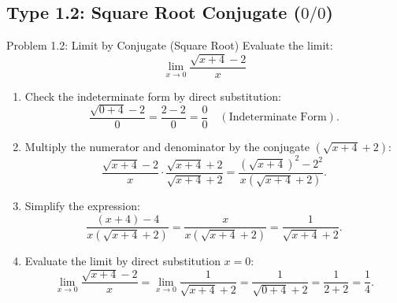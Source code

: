 \documentclass[11pt,a4paper]{article}
\begin{document}
\subsection{Type 1.2: Square Root Conjugate ($0/0$)}
\begin{problembox}{Problem 1.2: Limit by Conjugate (Square Root)}
Evaluate the limit:
\[
\lim_{x \to 0} \frac{\sqrt{x + 4} - 2}{x}
\]
\end{problembox}
\begin{solutionbox}
\begin{enumerate}
	\item [Step 1.] Check the indeterminate form by direct substitution:
	\begin{equation*}
		\frac{\sqrt{0 + 4} - 2}{0} = \frac{2 - 2}{0} = \frac{0}{0} \quad (\text{Indeterminate Form}).
	\end{equation*}
	
	\item [Step 2.] Multiply the numerator and denominator by the conjugate $(\sqrt{x + 4} + 2)$:
	\begin{equation*}
		\frac{\sqrt{x + 4} - 2}{x} \cdot \frac{\sqrt{x + 4} + 2}{\sqrt{x + 4} + 2} = \frac{(\sqrt{x + 4})^2 - 2^2}{x(\sqrt{x + 4} + 2)}.
	\end{equation*}

	\item [Step 3.] Simplify the expression:
	\begin{equation*}
		\frac{(x + 4) - 4}{x(\sqrt{x + 4} + 2)} = \frac{x}{x(\sqrt{x + 4} + 2)} = \frac{1}{\sqrt{x + 4} + 2}.
	\end{equation*}

	\item [Step 4.] Evaluate the limit by direct substitution $x = 0$:
	\begin{equation*}
		\lim_{x \to 0} \frac{\sqrt{x + 4} - 2}{x} = \lim_{x \to 0} \frac{1}{\sqrt{x + 4} + 2} = \frac{1}{\sqrt{0 + 4} + 2} = \frac{1}{2 + 2} = \frac{1}{4}.
	\end{equation*}
\end{enumerate}
\end{solutionbox}
\end{document}
